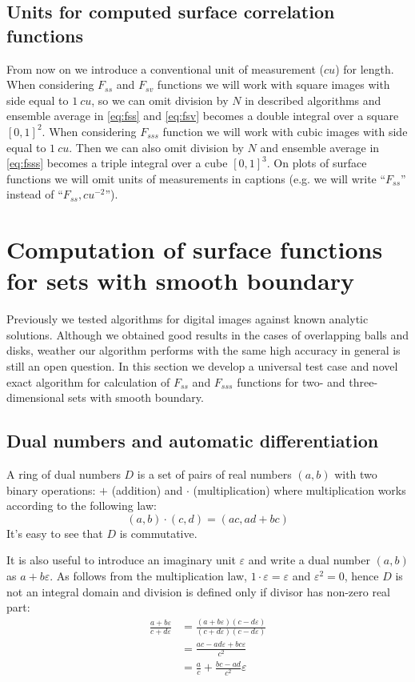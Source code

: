 \documentclass[preprint]{elsarticle}
\begin{document}
\subsection{Units for computed surface correlation functions}
From now on we introduce a conventional unit of measurement ($cu$) for length.
When considering $F_{ss}$ and $F_{sv}$ functions we will work with square images
with side equal to $1\ cu$, so we can omit division by $N$ in described
algorithms and ensemble average in \cref{eq:fss} and \cref{eq:fsv} becomes a
double integral over a square $[0, 1]^2$. When considering $F_{sss}$ function we
will work with cubic images with side equal to $1\ cu$. Then we can also omit
division by $N$ and ensemble average in \cref{eq:fsss} becomes a triple integral
over a cube $[0, 1]^3$. On plots of surface functions we will omit units of
measurements in captions (e.g. we will write ``$F_{ss}$'' instead of
``$F_{ss}, cu^{-2}$'').

\section{Computation of surface functions for sets with smooth boundary}
\label{sec:algo-precise}
Previously \cite{Samarin} we tested algorithms for digital images against known
analytic solutions. Although we obtained good results in the cases of
overlapping balls and disks, weather our algorithm performs with the same high
accuracy in general is still an open question. In this section we develop a
universal test case and novel exact algorithm for calculation of $F_{ss}$ and
$F_{sss}$ functions for two- and three-dimensional sets with smooth boundary.

\subsection{Dual numbers and automatic differentiation}
\label{sec:dual}
A ring of dual numbers $D$ is a set of pairs of real numbers $(a, b)$ with two
binary operations: $+$ (addition) and $\cdot$ (multiplication) where
multiplication works according to the following law:
\begin{equation}
  (a, b)\cdot(c, d) = (ac, ad + bc)
\end{equation}
It's easy to see that $D$ is commutative.

It is also useful to introduce an imaginary unit $\varepsilon$ and write a dual
number $(a, b)$ as $a + b\varepsilon$. As follows from the multiplication law,
$1\cdot \varepsilon = \varepsilon$ and $\varepsilon^2 = 0$, hence $D$ is not an
integral domain and division is defined only if divisor has non-zero real part:
\begin{equation}
  \begin{aligned}
    \frac{a+b\varepsilon}{c+d\varepsilon} &=
    \frac{(a+b\varepsilon)(c-d\varepsilon)}{(c+d\varepsilon)(c-d\varepsilon)} \\
    &= \frac{ac-ad\varepsilon+bc\varepsilon}{c^2} \\
    &= \frac{a}{c} + \frac{bc-ad}{c^2}\varepsilon
  \end{aligned}
\end{equation}
\end{document}
